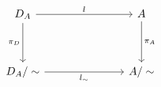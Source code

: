 \[\begin{tikzcd}
    {D_{A}} &&& A \\
    \\
    {D_{A}/\sim} &&& {A/\sim}
    \arrow["l", from=1-1, to=1-4]
    \arrow["{\pi_{D}}"', from=1-1, to=3-1]
    \arrow["{\pi_{A}}", from=1-4, to=3-4]
    \arrow["{l_{\sim}}"', from=3-1, to=3-4]
\end{tikzcd}\]
